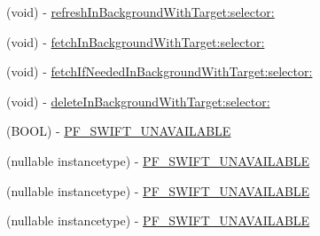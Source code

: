 \begin{DoxyCompactItemize}
\begin{DoxyCompactList}
 \end{DoxyCompactList}\item 
(void) -\/ \hyperlink{interface_p_f_object_ac412f8feeb1d679db129dbb78efde1af}{refresh\+In\+Background\+With\+Target\+:selector\+:}
\begin{DoxyCompactList}\small\item\em 

 \end{DoxyCompactList}\item 
(void) -\/ \hyperlink{interface_p_f_object_af3eacaaeffebd4cc0ba339d765a50ade}{fetch\+In\+Background\+With\+Target\+:selector\+:}
\item 
(void) -\/ \hyperlink{interface_p_f_object_acfcb1ff704744d8706dd63a5a17ca43a}{fetch\+If\+Needed\+In\+Background\+With\+Target\+:selector\+:}
\item 
(void) -\/ \hyperlink{interface_p_f_object_acdf9948630cfbfb6a2caa0aecfbf58cf}{delete\+In\+Background\+With\+Target\+:selector\+:}
\begin{DoxyCompactList}\small\item\em 

 \end{DoxyCompactList}\item 
(B\+O\+O\+L) -\/ \hyperlink{interface_p_f_object_adbd353cd498462b7749c7a2ad0d745d0}{P\+F\+\_\+\+S\+W\+I\+F\+T\+\_\+\+U\+N\+A\+V\+A\+I\+L\+A\+B\+L\+E}
\begin{DoxyCompactList}\small\item\em 

 \end{DoxyCompactList}\item 
(nullable instancetype) -\/ \hyperlink{interface_p_f_object_ad0b180e967b91e24842e7679c73749b5}{P\+F\+\_\+\+S\+W\+I\+F\+T\+\_\+\+U\+N\+A\+V\+A\+I\+L\+A\+B\+L\+E}
\begin{DoxyCompactList}\small\item\em 

 \end{DoxyCompactList}\item 
(nullable instancetype) -\/ \hyperlink{interface_p_f_object_ad0b180e967b91e24842e7679c73749b5}{P\+F\+\_\+\+S\+W\+I\+F\+T\+\_\+\+U\+N\+A\+V\+A\+I\+L\+A\+B\+L\+E}
\item 
(nullable instancetype) -\/ \hyperlink{interface_p_f_object_ad0b180e967b91e24842e7679c73749b5}{P\+F\+\_\+\+S\+W\+I\+F\+T\+\_\+\+U\+N\+A\+V\+A\+I\+L\+A\+B\+L\+E}
\begin{DoxyCompactList}\small\item\em 


\end{DoxyCompactList}
\end{DoxyCompactItemize}
